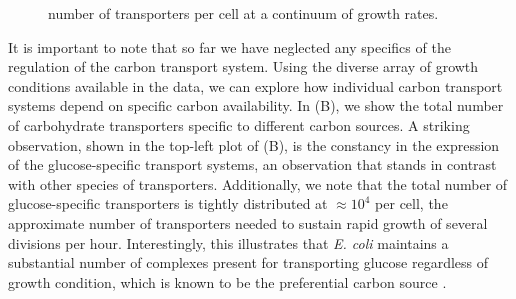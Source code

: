 \begin{figure}
\begin{fullwidth}
{    number of transporters per cell at a continuum of growth
    rates.}\label{fig:carbon_tport} \label{figsupp:phospho_sulfo}
    \end{fullwidth}
\end{figure}

It is important to note that so far we have neglected any specifics of the
regulation of the carbon transport system. Using the diverse array of
growth conditions available in the data, we can explore how individual carbon
transport systems depend on specific carbon availability. In
(B), we show the total number of carbohydrate transporters
specific to different carbon sources. A striking observation, shown in the
top-left plot of (B), is the constancy in the expression of
the glucose-specific transport systems, an observation that stands in contrast
with other species of transporters. Additionally, we note that the total
number of glucose-specific transporters is tightly distributed at $\approx 10^4$
per cell, the approximate number of transporters needed to sustain rapid growth
of several divisions per hour. Interestingly, this illustrates that \textit{E. coli} maintains a substantial number of complexes present for transporting glucose regardless of growth condition, which is known to be the preferential carbon source
\citep{monod1947, liu2005a, aidelberg2014}.

